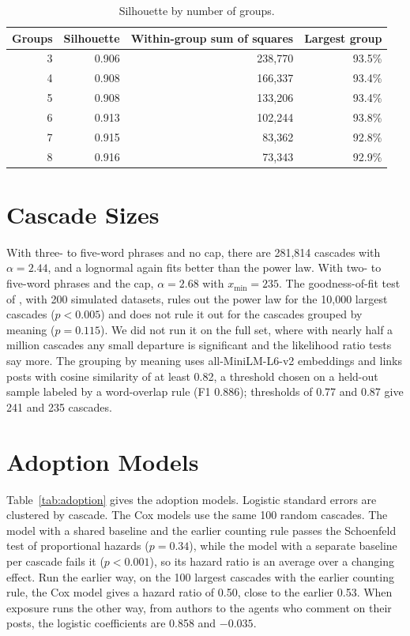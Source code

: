 \documentclass[11pt]{article}
\begin{document}
\begin{table}[H]
\centering
\caption{Silhouette by number of groups.}
\label{tab:ksweep}
\small
\begin{tabular}{@{}rrrr@{}}
\toprule
\textbf{Groups} & \textbf{Silhouette} & \textbf{Within-group sum of squares} & \textbf{Largest group} \\
\midrule
3 & 0.906 & 238,770 & 93.5\% \\
4 & 0.908 & 166,337 & 93.4\% \\
5 & 0.908 & 133,206 & 93.4\% \\
6 & 0.913 & 102,244 & 93.8\% \\
7 & 0.915 & 83,362 & 92.8\% \\
8 & 0.916 & 73,343 & 92.9\% \\
\bottomrule
\end{tabular}
\end{table}

\section{Cascade Sizes}
\label{app:powerlaw}

With three- to five-word phrases and no cap, there are 281,814 cascades with $\alpha = 2.44$, and a lognormal again fits better than the power law. With two- to five-word phrases and the cap, $\alpha = 2.68$ with $x_{\min} = 235$. The goodness-of-fit test of \citet{clauset2009power}, with 200 simulated datasets, rules out the power law for the 10,000 largest cascades ($p < 0.005$) and does not rule it out for the cascades grouped by meaning ($p = 0.115$). We did not run it on the full set, where with nearly half a million cascades any small departure is significant and the likelihood ratio tests say more. The grouping by meaning uses all-MiniLM-L6-v2 embeddings and links posts with cosine similarity of at least 0.82, a threshold chosen on a held-out sample labeled by a word-overlap rule (F1 0.886); thresholds of 0.77 and 0.87 give 241 and 235 cascades.

\section{Adoption Models}
\label{app:adoption}

Table~\ref{tab:adoption} gives the adoption models. Logistic standard errors are clustered by cascade. The Cox models use the same 100 random cascades. The model with a shared baseline and the earlier counting rule passes the Schoenfeld test of proportional hazards ($p = 0.34$), while the model with a separate baseline per cascade fails it ($p < 0.001$), so its hazard ratio is an average over a changing effect. Run the earlier way, on the 100 largest cascades with the earlier counting rule, the Cox model gives a hazard ratio of 0.50, close to the earlier 0.53. When exposure runs the other way, from authors to the agents who comment on their posts, the logistic coefficients are 0.858 and $-0.035$.
\end{document}
